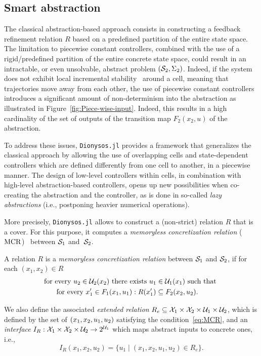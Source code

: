 \documentclass{juliacon}
\begin{document}
\subsection{Smart abstraction} 

The classical abstraction-based approach consists in constructing a feedback refinement relation $R$ based on a predefined partition of the entire state space. 
The limitation to piecewise constant controllers, combined with the use of a rigid/predefined partition of the entire concrete state space, could result in an intractable, or even unsolvable, abstract problem $(\mathcal{S}_2, \Sigma_2)$.
Indeed, if the system does not exhibit local incremental stability~\cite[Definition 2.1]{angeli2002lyapunov}\cite{lohmiller1998contraction} around a cell, meaning that trajectories move away from each other, the use of piecewise constant controllers introduces a significant amount of non-determinism into the abstraction as illustrated in Figure~\ref{fig:Piece-wise-input}. 
%
Indeed, this results in a high cardinality of the set of 
outputs of the transition map $F_2(x_2,u)$ of the abstraction.
\vskip 6pt

To address these issues, \texttt{Dionysos.jl} provides a framework that generalizes the classical approach by allowing the use of overlapping cells and state-dependent controllers which are defined differently from one cell to another, in a piecewise manner.
The design of low-level controllers within cells, in combination with high-level abstraction-based controllers, opens up new possibilities when co-creating the abstraction and the controller, as is done in so-called \emph{lazy abstractions} (i.e., postponing heavier numerical operations).

\vskip 6pt
More precisely, \texttt{Dionysos.jl} allows to construct a (non-strict) relation $R$ that is a cover.
For this purpose, it computes a \emph{memoryless concretization relation} ($\operatorname{MCR}$)~\cite[Definition 8]{Calbert2024a} between $\mathcal{S}_1$ and~$\mathcal{S}_2$.
\begin{defi}
A relation $R$ is a \emph{memoryless concretization relation} between $\mathcal{S}_1$ and $\mathcal{S}_2$, if for each $(x_1,x_2)\in R$ 
\begin{align}\label{eq:MCR}
    & \text{for every } u_2\in \mathcal{U}_2(x_2) \text{ there exists } u_1\in \mathcal{U}_1(x_1) \text{ such that }\nonumber\\
    & \hspace{0.5cm}\text{ for every }x_1'\in F_1(x_1,u_1): R(x_1')\subseteq F_2(x_2,u_2).
\end{align}
\end{defi}
We also define the associated \emph{extended relation} $R_e\subseteq \mathcal{X}_1\times \mathcal{X}_2\times \mathcal{U}_1\times \mathcal{U}_2$, which is defined by the set of $(x_1, x_2, u_1, u_2)$ satisfying the condition~\eqref{eq:MCR}, and an \emph{interface} $I_R:\mathcal{X}_1\times \mathcal{X}_2\times \mathcal{U}_2 \rightarrow 2^{\mathcal{U}_1}$ which maps abstract inputs to concrete ones, i.e., 
$$I_R(x_1, x_2, u_2)= \{u_1 \mid (x_1,x_2,u_1,u_2)\in R_e\}.$$
\end{document}
